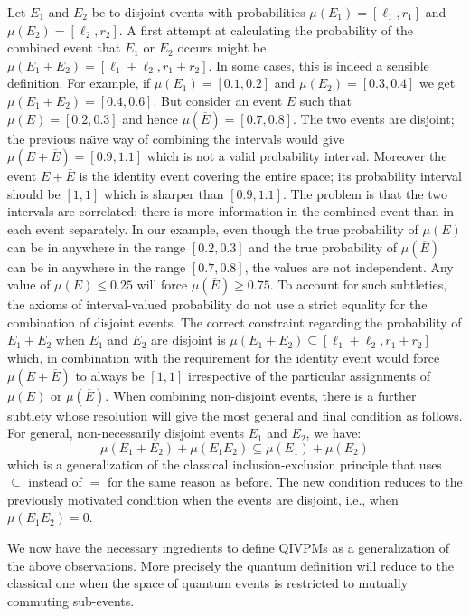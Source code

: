\documentclass[english,reprint, aps, prl,superscriptaddress, showpacs,
showkeys, longbibliography, amsmath, amssymb]{revtex4-1}
\theoremstyle{plain}
\theoremstyle{definition}
\begin{document}
Let $E_1$ and $E_2$ be to disjoint events with probabilities
$\mu(E_1)=[\ell_1,r_1]$ and $\mu(E_2)=[\ell_2,r_2]$. A first attempt
at calculating the probability of the combined event that $E_1$ or
$E_2$ occurs might be $\mu(E_1+E_2) = [\ell_1+\ell_2,r_1+r_2]$. In
some cases, this is indeed a sensible definition. For example, if
$\mu(E_1)=[0.1,0.2]$ and $\mu(E_2)=[0.3,0.4]$ we get
$\mu(E_1+E_2) = [0.4,0.6]$. But consider an event $E$ such that
$\mu(E)=[0.2,0.3]$ and hence $\mu(\overline{E})=[0.7,0.8]$. The two
events are disjoint; the previous na\"\i ve way of combining the
intervals would give $\mu(E+\overline{E})=[0.9,1.1]$ which is not a
valid probability interval. Moreover the event $E+\overline{E}$ is the
identity event covering the entire space; its probability interval
should be $[1,1]$ which is sharper than $[0.9,1.1]$. The problem is
that the two intervals are correlated: there is more information in
the combined event than in each event separately. In our example, even
though the true probability of $\mu(E)$ can be in anywhere in the
range $[0.2,0.3]$ and the true probability of $\mu(\overline{E})$ can
be in anywhere in the range $[0.7,0.8]$, the values are not
independent. Any value of $\mu(E) \leq 0.25$ will force
$\mu(\overline{E})\geq 0.75$. To account for such subtleties, the
axioms of interval-valued probability do not use a strict equality for
the combination of disjoint events. The correct constraint regarding
the probability of $E_1+E_2$ when $E_1$ and $E_2$ are disjoint is
$\mu(E_1+E_2) \subseteq [\ell_1+\ell_2,r_1+r_2]$ which, in combination
with the requirement for the identity event would force
$\mu(E+\overline{E})$ to always be $[1,1]$ irrespective of the
particular assignments of $\mu(E)$ or $\mu(\overline{E})$. When
combining non-disjoint events, there is a further subtlety whose
resolution will give the most general and final condition as
follows. For general, non-necessarily disjoint events $E_1$ and $E_2$,
we have:
\begin{equation}
\mu(E_1+E_2) + \mu(E_1E_2) \subseteq \mu(E_1) + \mu(E_2)
\label{eq:classicalconvex}
\end{equation}
which is a generalization of the classical inclusion-exclusion
principle that uses $\subseteq$ instead of $=$ for the same reason as
before. The new condition reduces to the previously motivated
condition when the events are disjoint, i.e., when $\mu(E_1E_2) = 0$. 

We now have the necessary ingredients to define QIVPMs as a
generalization of the above observations. More precisely the quantum
definition will reduce to the classical one when the space of quantum
events is restricted to mutually commuting sub-events. 
\end{document}
